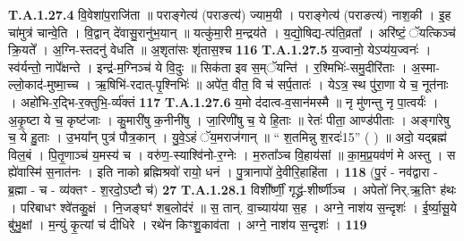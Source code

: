 \documentclass[17pt]{extarticle}
\begin{document}
                                                                  \textbf{ T.A.1.27.4} \newline
                  वि॒वेशा॑प॒राजि॑ता ॥ पराङ्गेत्य॑ (पराङत्य॑) ज्याम॒यी ।  पराङ्गेत्य॑ (पराङत्य॑) नाश॒की । इ॒ह चा॑मुत्र॑ चान्वे॒ति । वि॒द्वान् दे॑वासु॒रानु॑भ॒यान् ॥  यत्कु॑मा॒री म॒न्द्रय॑ते । य॒द्यो॒षिद्य-त्प॑ति॒व्रता᳚ । अरि॑ष्टं॒ ॅयत्किञ्च॑ क्रि॒यते᳚ ।  अ॒ग्नि-स्तदनु॑ वेधति ॥ अ॒शृता॑सः शृ॑तास॒श्च \textbf{ 116} \newline
                  \newline
                                                                  \textbf{ T.A.1.27.5} \newline
                  य॒ज्वानो॒ येऽप्य॑य॒ज्वनः॑ । स्व॑र्यन्तो॒ नापे᳚क्षन्ते ।  इन्द्र॑-म॒ग्निञ्च॑ ये वि॒दुः ॥ सिक॑ता इव स॒म्ॅयन्ति॑ ।  र॒श्मिभिः॑-समु॒दीरि॑ताः । अ॒स्मा-ल्लो॒काद॑-मुष्मा॒च्च । ऋ॒षिभि॑-रदात्-पृ॒श्निभिः॑ ॥ अपे॑त॒ वीत॒ वि च॑ सर्प॒तातः॑ । येऽत्र॒ स्थ पु॑रा॒णा ये च॒ नूत॑नाः ।  अहो॑भि-र॒द्भि-र॒क्तुभि॒-र्व्य॑क्तं \textbf{ 117} \newline
                  \newline
                                                                  \textbf{ T.A.1.27.6} \newline
                  य॒मो द॑दात्व-व॒सान॑मस्मै ॥ नृ मु॑णन्तु नृ पा॒त्वर्यः॑ । अ॒कृ॒ष्टा ये च॒ कृष्ट॑जाः । कु॒मारी॑षु क॒नीनी॑षु । जा॒रिणी॑षु च॒ ये हि॒ताः ॥ रेतः॑ पीता॒ आण्ड॑पीताः । अङ्गा॑रेषु च॒ ये हु॒ताः । उ॒भया᳚न् पुत्र॑ पौत्र॒कान् । यु॒वे॒ऽहं ॅय॒मराज॑गान् ॥ “ श॒तमिन्नु श॒रदः॑{15}” ( ) ॥  अदो॒ यद्ब्रह्म॑ विल॒बं । पि॒तृ॒णाञ्च॑ य॒मस्य॑ च ।  वरु॑ण॒-स्याश्वि॑नो-र॒ग्नेः । म॒रुता᳚ञ्च वि॒हाय॑सां ॥  का॒म॒प्र॒यव॑णं मे अस्तु । स ह्ये॑वास्मि॑ स॒नात॑नः । इति नाको ब्रह्मिश्रवो॑ रायो॒ धनं । पु॒त्रानापो॑ दे॒वीरि॒हाहि॑ता । \textbf{ 118} \newline
                  \newline
                                                        (पु॒रं - नव॑द्वारा - ब्र॒ह्मा - च - व्य॑क्तꣳ - श॒रदो॒ऽष्टौ च॑) \textbf{27} \newline \newline
                                \textbf{ T.A.1.28.1} \newline
                  विशी᳚र्ष्णीं॒ गृद्ध्र॑-शीर्ष्णीञ्च । अपेतो॑ निर्.ऋ॒तिꣳ ह॑थः । परिबाधꣳ श्वे॑तकु॒क्षं । नि॒जङ्घꣳ॑ शब॒लोद॑रं ॥ स॒ तान्. वा॒च्याय॑या स॒ह । अग्ने॒ नाश॑य स॒न्दृशः॑ । ई॒र्ष्या॒सू॒ये बु॑भु॒क्षां । म॒न्युं कृ॒त्यां च॑ दीधिरे । रथे॑न किꣳशु॒काव॑ता । अग्ने॒ नाश॑य स॒न्दृशः॑ । \textbf{ 119} \newline
\end{document}
